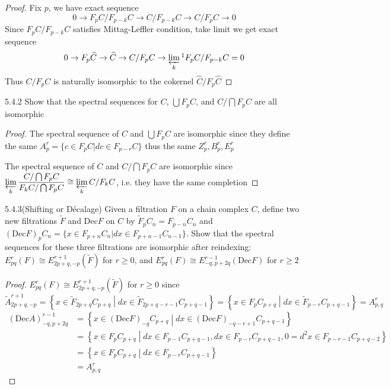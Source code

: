 \documentclass[../main.tex]{subfiles}
\begin{document}
\begin{proof}
Fix $p$, we have exact sequence
\[0\to F_pC/F_{p-k}C\to C/F_{p-k}C\to C/F_pC\to 0\]
Since $F_pC/F_{p-k}C$ satisfies Mittag-Leffler condition, take limit we get exact sequence
\[0\to F_p\widehat{C}\to\widehat C\to C/F_pC\to\varprojlim_k\textstyle^1{F_pC/F_{p-k}C}=0\]
Thus $C/F_pC$ is naturally isomorphic to the cokernel $\widehat C/F_p\widehat{C}$
\end{proof}

\begin{customexercise}{5.4.2}
Show that the spectral sequences for $C$, $\bigcup F_pC$, and $C/\bigcap F_pC$ are all isomorphic
\end{customexercise}

\begin{proof}
The spectral sequence of $C$ and $\bigcup F_pC$ are isomorphic since they define the same $A^r_p=\{c\in F_pC|dc\in F_{p-r}C\}$ thus the same $Z^r_p,B^r_p,E^r_p$ \par
The spectral sequence of $C$ and $C/\bigcap F_pC$ are isomorphic since $\displaystyle\varprojlim_k\dfrac{C/\bigcap F_pC}{F_kC/\bigcap F_pC}\cong\varprojlim_k C/F_kC$, i.e. they have the same completion
\end{proof}

\begin{customexercise}{5.4.3}(Shifting or D\'ecalage) Given a filtration $F$ on a chain complex $C$, define two new filtrations $\widetilde F$ and $\mathrm{Dec} F$ on $C$ by $\widetilde F_pC_n=F_{p-n}C_n$ and $(\mathrm{Dec}F)_pC_n=\{x\in F_{p+n}C_n|dx\in F_{p+n-1}C_{n-1}\}$. Show that the spectral sequences for these three filtrations are isomorphic after reindexing: $E^r_{pq}(F)\cong E^{r+1}_{2p+q,-p}(\widetilde F)$ for $r\geq0$, and $E^r_{pq}(F)\cong{} E^{r-1}_{-q,p+2q}(\mathrm{Dec} F)$ for $r\geq2$
\end{customexercise}

\begin{proof}
$E^r_{pq}(F)\cong E^{r+1}_{2p+q,-p}(\widetilde F)$ for $r\geq0$ since
\[\widetilde A^{r+1}_{2p+q,-p}=\left\{x\in\widetilde F_{2p+q}C_{p+q}\middle|dx\in\widetilde F_{2p+q-r-1}C_{p+q-1}\right\}=\left\{x\in F_{p}C_{p+q}\middle|dx\in\widetilde F_{p-r}C_{p+q-1}\right\}=A^r_{p,q}\]
\begin{align*}
(\mathrm{Dec}A)^{r-1}_{-q,p+2q}&=\left\{x\in (\mathrm{Dec}F)_{-q}C_{p+q}\middle|dx\in(\mathrm{Dec}F)_{-q-r+1}C_{p+q-1}\right\} \\
&=\left\{x\in F_pC_{p+q}\middle|dx\in F_{p-1}C_{p+q-1},dx\in F_{p-r}C_{p+q-1},0=d^2x\in F_{p-r-1}C_{p+q-2}\right\} \\
&=\left\{x\in F_pC_{p+q}\middle|dx\in F_{p-r}C_{p+q-1}\right\} \\
&= A^r_{p,q}
\end{align*}
\end{proof}
\end{document}
